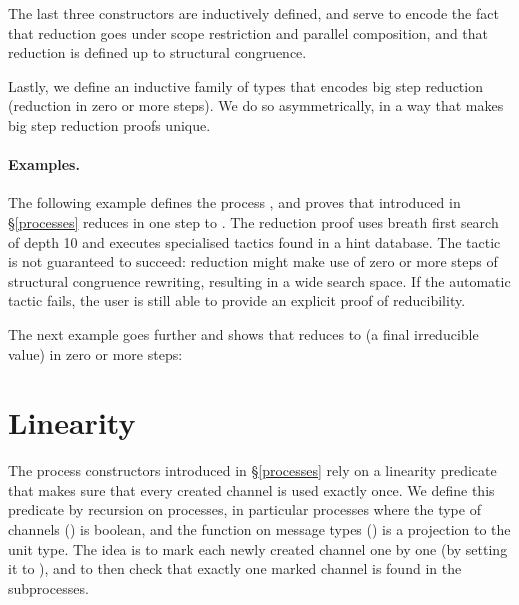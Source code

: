 \documentclass{mproj}
\begin{document}

The last three constructors are inductively defined, and serve to encode the fact that reduction goes under scope restriction and parallel composition, and that reduction is defined up to structural congruence.


Lastly, we define an inductive family of types that encodes big step reduction (reduction in zero or more steps). We do so asymmetrically, in a way that makes big step reduction proofs unique.


\paragraph{Examples.}

The following example defines the process , and proves that  introduced in \S \ref{processes} reduces in one step to . The reduction proof uses breath first search of depth 10 and executes specialised tactics found in a hint database. The tactic is not guaranteed to succeed: reduction might make use of zero or more steps of structural congruence rewriting, resulting in a wide search space. If the automatic tactic fails, the user is still able to provide an explicit proof of reducibility.


The next example goes further and shows that  reduces to  (a final irreducible value) in zero or more steps:


\section{Linearity}\label{linearity}

The process constructors introduced in \S \ref{processes} rely on a linearity predicate that makes sure that every created channel is used exactly once. We define this predicate by recursion on processes, in particular processes where the type of channels () is boolean, and the function on message types () is a projection to the unit type. The idea is to mark each newly created channel one by one (by setting it to ), and to then check that exactly one marked channel is found in the subprocesses.
\end{document}
